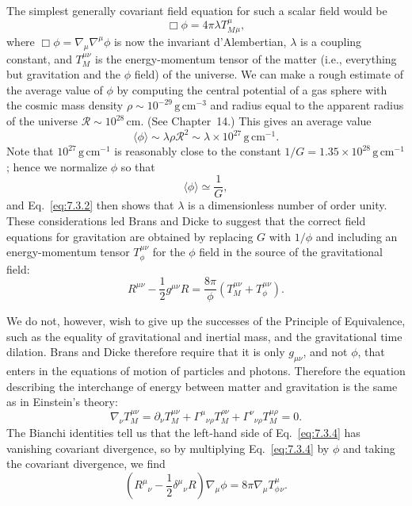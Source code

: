 The simplest generally covariant field equation for such a scalar field would
be
\begin{equation}
  \Box\phi
  =
  4\pi\lambda T_M^\mu{}_\mu,
  \tag{7.3.1}\label{eq:7.3.1}
\end{equation}
where \(\Box\phi=\nabla_\mu\nabla^\mu\phi\) is now the invariant
d'Alembertian, \(\lambda\) is a coupling constant, and \(T_M^{\mu\nu}\) is
the energy-momentum tensor of the matter (i.e., everything but gravitation
and the \(\phi\) field) of the universe. We can make a rough estimate of the
average value of \(\phi\) by computing the central potential of a gas sphere
with the cosmic mass density \(\rho\sim10^{-29}\,\mathrm{g\,cm^{-3}}\) and
radius equal to the apparent radius of the universe
\(\mathcal R\sim10^{28}\,\mathrm{cm}\). (See Chapter~14.) This gives an
average value
\begin{equation}
  \langle\phi\rangle
  \sim
  \lambda\rho\mathcal R^2
  \sim
  \lambda\times10^{27}\,\mathrm{g\,cm^{-1}}.
  \tag{7.3.2}\label{eq:7.3.2}
\end{equation}
Note that \(10^{27}\,\mathrm{g\,cm^{-1}}\) is reasonably close to the
constant \(1/G=1.35\times10^{28}\,\mathrm{g\,cm^{-1}}\); hence we normalize
\(\phi\) so that
\begin{equation}
  \langle\phi\rangle\simeq\frac1G,
  \tag{7.3.3}\label{eq:7.3.3}
\end{equation}
and Eq.~\eqref{eq:7.3.2} then shows that \(\lambda\) is a dimensionless
number of order unity. These considerations led Brans and Dicke to suggest
that the correct field equations for gravitation are obtained by replacing
\(G\) with \(1/\phi\) and including an energy-momentum tensor
\(T_\phi^{\mu\nu}\) for the \(\phi\) field in the source of the
gravitational field:
\begin{equation}
  R^{\mu\nu}-\frac12g^{\mu\nu}R
  =
  \frac{8\pi}{\phi}
  \left(T_M^{\mu\nu}+T_\phi^{\mu\nu}\right).
  \tag{7.3.4}\label{eq:7.3.4}
\end{equation}

We do not, however, wish to give up the successes of the Principle of
Equivalence, such as the equality of gravitational and inertial mass, and the
gravitational time dilation. Brans and Dicke therefore require that it is
only \(g_{\mu\nu}\), and not \(\phi\), that enters in the equations of motion
of particles and photons. Therefore the equation describing the interchange
of energy between matter and gravitation is the same as in Einstein's theory:
\begin{equation}
  \nabla_\nu T_M^{\mu\nu}
  =
  \partial_\nu T_M^{\mu\nu}
  +\Gamma^\mu{}_{\nu\rho}T_M^{\rho\nu}
  +\Gamma^\nu{}_{\nu\rho}T_M^{\mu\rho}
  =
  0.
  \tag{7.3.5}\label{eq:7.3.5}
\end{equation}
The Bianchi identities tell us that the left-hand side of
Eq.~\eqref{eq:7.3.4} has vanishing covariant divergence, so by multiplying
Eq.~\eqref{eq:7.3.4} by \(\phi\) and taking the covariant divergence, we
find
\begin{equation}
  \left(R^\mu{}_\nu-\frac12\delta^\mu{}_\nu R\right)
  \nabla_\mu\phi
  =
  8\pi\nabla_\mu T_\phi^\mu{}_\nu.
  \tag{7.3.6}\label{eq:7.3.6}
\end{equation}


